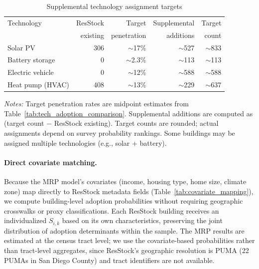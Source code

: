 \begin{table}[htbp]
\centering
\caption{Supplemental technology assignment targets}
\label{tab:supplemental_targets}
\begin{tabular}{lrrrr}
\toprule
Technology & ResStock & Target & Supplemental & Target \\
           & existing & penetration & additions & count \\
\midrule
Solar PV         & 306 & $\sim$17\% & $\sim$527 & $\sim$833 \\
Battery storage  &   0 & $\sim$2.3\% & $\sim$113 & $\sim$113 \\
Electric vehicle &   0 & $\sim$12\% & $\sim$588 & $\sim$588 \\
Heat pump (HVAC) & 408 & $\sim$13\% & $\sim$229 & $\sim$637 \\
\bottomrule
\end{tabular}
\begin{tablenotes}
\small
\item \textit{Notes:} Target penetration rates are midpoint estimates from Table~\ref{tab:tech_adoption_comparison}. Supplemental additions are computed as (target count $-$ ResStock existing). Target counts are rounded; actual assignments depend on survey probability rankings. Some buildings may be assigned multiple technologies (e.g., solar + battery).
\end{tablenotes}
\end{table}

\paragraph{Direct covariate matching.}
Because the MRP model's covariates (income, housing type, home size, climate zone) map directly to ResStock metadata fields (Table~\ref{tab:covariate_mapping}), we compute building-level adoption probabilities without requiring geographic crosswalks or proxy classifications. Each ResStock building receives an individualized $S_{i,k}$ based on its own characteristics, preserving the joint distribution of adoption determinants within the sample. The MRP results are estimated at the census tract level; we use the covariate-based probabilities rather than tract-level aggregates, since ResStock's geographic resolution is PUMA (22 PUMAs in San Diego County) and tract identifiers are not available.


